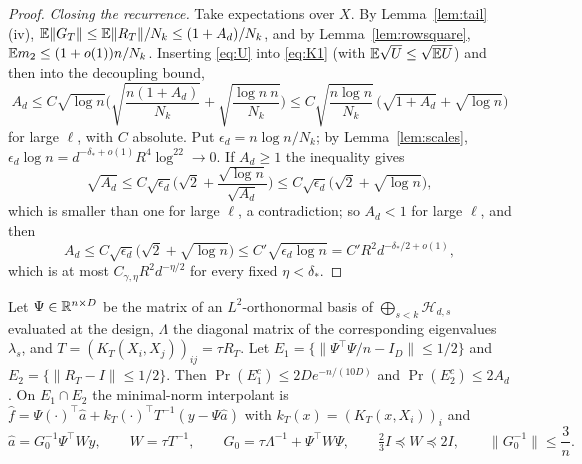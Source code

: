 \begin{proof}
\emph{Closing the recurrence.} Take expectations over $X$. By Lemma~\ref{lem:tail}(iv),
$\mathbb{E}\|G_T\|\le\mathbb{E}\|R_T\|/N_k\le(1+A_d)/N_k$, and by Lemma~\ref{lem:rowsquare}, $\mathbb{E} m_2\le(1+o(1))n/N_k$.
Inserting \eqref{eq:U} into \eqref{eq:K1} (with $\mathbb{E}\sqrt U\le\sqrt{\mathbb{E} U}$) and then into the decoupling bound,
\[
A_d\le C\sqrt{\log n}\Big(\sqrt{\frac{n(1+A_d)}{N_k}}+\sqrt{\frac{\log n\ n}{N_k}}\Big)
\le C\sqrt{\frac{n\log n}{N_k}}\,\big(\sqrt{1+A_d}+\sqrt{\log n}\big)
\]
for large $\ell$, with $C$ absolute. Put $\epsilon_d=n\log n/N_k$; by Lemma~\ref{lem:scales},
$\epsilon_d\log n=d^{-\delta_*+o(1)}R^4\log^22\to0$. If $A_d\ge1$ the inequality gives
\[
\sqrt{A_d}\le C\sqrt{\epsilon_d}\Big(\sqrt2+\frac{\sqrt{\log n}}{\sqrt{A_d}}\Big)\le C\sqrt{\epsilon_d}\big(\sqrt2+\sqrt{\log n}\big),
\]
which is smaller than one for large $\ell$, a contradiction; so $A_d<1$ for large $\ell$, and then
\[
A_d\le C\sqrt{\epsilon_d}\big(\sqrt2+\sqrt{\log n}\big)\le C'\sqrt{\epsilon_d\log n}=C'R^2d^{-\delta_*/2+o(1)},
\]
which is at most $C_{\gamma,\eta}R^2d^{-\eta/2}$ for every fixed $\eta<\delta_*$.
\end{proof}

\begin{lemma}\label{lem:lowblock}
Let $\Psi\in\mathbb{R}^{n\times D}$ be the matrix of an $L^2$-orthonormal basis of $\bigoplus_{s<k}\mathcal H_{d,s}$
evaluated at the design, $\Lambda$ the diagonal matrix of the corresponding eigenvalues $\lambda_s$, and
$T=(K_T(X_i,X_j))_{ij}=\tau R_T$. Let $E_1=\{\|\Psi^\top\Psi/n-I_D\|\le1/2\}$ and $E_2=\{\|R_T-I\|\le1/2\}$. Then
$\Pr(E_1^c)\le2De^{-n/(10D)}$ and $\Pr(E_2^c)\le2A_d$. On $E_1\cap E_2$ the minimal-norm interpolant is
$\hat f=\Psi(\cdot)^\top\hat a+k_T(\cdot)^\top T^{-1}(y-\Psi\hat a)$ with $k_T(x)=(K_T(x,X_i))_i$ and
\begin{equation}
\hat a=G_0^{-1}\Psi^\top Wy,\qquad W=\tau T^{-1},\qquad G_0=\tau\Lambda^{-1}+\Psi^\top W\Psi,\qquad
\tfrac23I\preceq W\preceq2I,\qquad \|G_0^{-1}\|\le\frac3n .
\label{eq:normal}
\end{equation}
\end{lemma}

